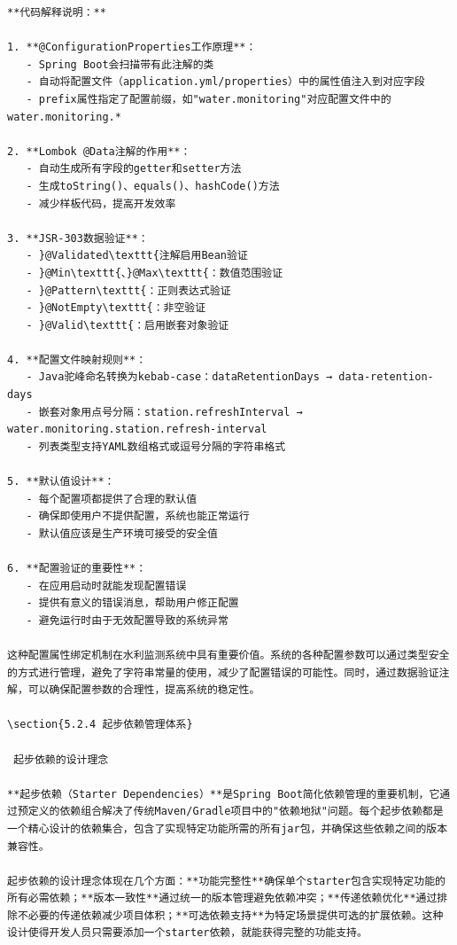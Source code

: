 \begin{lstlisting}
**代码解释说明：**

1. **@ConfigurationProperties工作原理**：
   - Spring Boot会扫描带有此注解的类
   - 自动将配置文件（application.yml/properties）中的属性值注入到对应字段
   - prefix属性指定了配置前缀，如"water.monitoring"对应配置文件中的water.monitoring.*

2. **Lombok @Data注解的作用**：
   - 自动生成所有字段的getter和setter方法
   - 生成toString()、equals()、hashCode()方法
   - 减少样板代码，提高开发效率

3. **JSR-303数据验证**：
   - }@Validated\texttt{注解启用Bean验证
   - }@Min\texttt{、}@Max\texttt{：数值范围验证
   - }@Pattern\texttt{：正则表达式验证
   - }@NotEmpty\texttt{：非空验证
   - }@Valid\texttt{：启用嵌套对象验证

4. **配置文件映射规则**：
   - Java驼峰命名转换为kebab-case：dataRetentionDays → data-retention-days
   - 嵌套对象用点号分隔：station.refreshInterval → water.monitoring.station.refresh-interval
   - 列表类型支持YAML数组格式或逗号分隔的字符串格式

5. **默认值设计**：
   - 每个配置项都提供了合理的默认值
   - 确保即使用户不提供配置，系统也能正常运行
   - 默认值应该是生产环境可接受的安全值

6. **配置验证的重要性**：
   - 在应用启动时就能发现配置错误
   - 提供有意义的错误消息，帮助用户修正配置
   - 避免运行时由于无效配置导致的系统异常

这种配置属性绑定机制在水利监测系统中具有重要价值。系统的各种配置参数可以通过类型安全的方式进行管理，避免了字符串常量的使用，减少了配置错误的可能性。同时，通过数据验证注解，可以确保配置参数的合理性，提高系统的稳定性。

\section{5.2.4 起步依赖管理体系}

 起步依赖的设计理念

**起步依赖（Starter Dependencies）**是Spring Boot简化依赖管理的重要机制，它通过预定义的依赖组合解决了传统Maven/Gradle项目中的"依赖地狱"问题。每个起步依赖都是一个精心设计的依赖集合，包含了实现特定功能所需的所有jar包，并确保这些依赖之间的版本兼容性。

起步依赖的设计理念体现在几个方面：**功能完整性**确保单个starter包含实现特定功能的所有必需依赖；**版本一致性**通过统一的版本管理避免依赖冲突；**传递依赖优化**通过排除不必要的传递依赖减少项目体积；**可选依赖支持**为特定场景提供可选的扩展依赖。这种设计使得开发人员只需要添加一个starter依赖，就能获得完整的功能支持。
\end{lstlisting}


